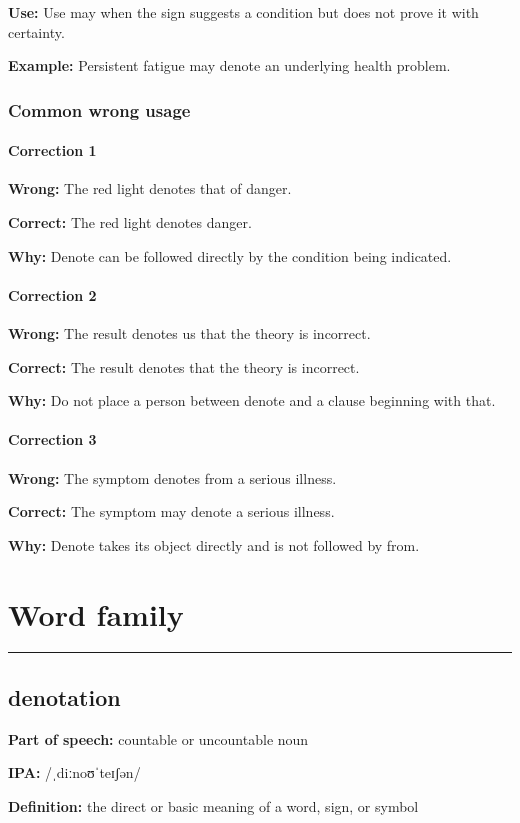 \documentclass[11pt]{article}
\newcommand{\sectionrule}{\par\vspace{-0.5em}\noindent\textcolor{Accent}{\rule{\linewidth}{0.6pt}}\par}
\begin{document}
\textbf{Use:} Use may when the sign suggests a condition but does not prove it with certainty.

\textbf{Example:} Persistent fatigue may denote an underlying health problem.

\subsubsection{Common wrong usage}
\paragraph{Correction 1}
\textbf{Wrong:} The red light denotes that of danger.

\textbf{Correct:} The red light denotes danger.

\textbf{Why:} Denote can be followed directly by the condition being indicated.

\paragraph{Correction 2}
\textbf{Wrong:} The result denotes us that the theory is incorrect.

\textbf{Correct:} The result denotes that the theory is incorrect.

\textbf{Why:} Do not place a person between denote and a clause beginning with that.

\paragraph{Correction 3}
\textbf{Wrong:} The symptom denotes from a serious illness.

\textbf{Correct:} The symptom may denote a serious illness.

\textbf{Why:} Denote takes its object directly and is not followed by from.

\section{Word family}
\sectionrule
\subsection{denotation}
\textbf{Part of speech:} countable or uncountable noun

\textbf{IPA:} /ˌdiːnoʊˈteɪʃən/

\textbf{Definition:} the direct or basic meaning of a word, sign, or symbol
\end{document}

